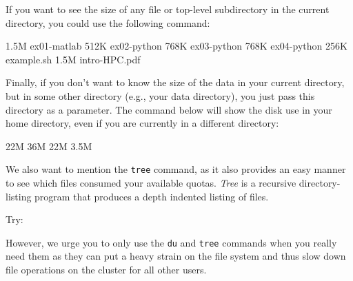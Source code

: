 If you want to see the size of any file or top-level subdirectory in the
current directory, you could use the following command:

\begin{prompt}
1.5M ex01-matlab
512K ex02-python
768K ex03-python
768K ex04-python
256K example.sh
1.5M intro-HPC.pdf
\end{prompt}


Finally, if you don't want to know the size of the data in your current
directory, but in some other directory (e.g., your data directory), you just
pass this directory as a parameter. The command below will show the disk use
in your home directory, even if you are currently in a different directory:

\begin{prompt}
22M %
36M %
22M %
3.5M %
\end{prompt}

\ifgent
\else
  We also want to mention the \texttt{tree} command, as it also provides an easy
  manner to see which files consumed your available quotas. \emph{Tree} is a
  recursive directory-listing program that produces a depth indented listing of
  files.

  Try:

\begin{prompt}
\end{prompt}

However, we urge you to only use the \texttt{du} and \texttt{tree} commands when you
really need them as they can put a heavy strain on the file system and thus
slow down file operations on the cluster for all other users.
\fi
